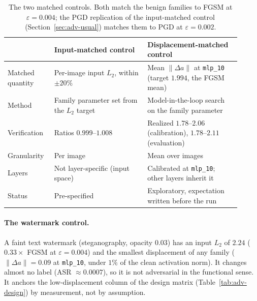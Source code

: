 \documentclass[../ppgc-tese.tex]{subfiles}
\begin{document}
\begin{table}[ht]
  \centering
  \caption{The two matched controls. Both match the benign families to FGSM at
  $\varepsilon{=}0.004$; the PGD replication of the input-matched control
  (Section~\ref{sec:adv-usual}) matches them to PGD at $\varepsilon{=}0.002$.}
  \label{tab:adv-controls}
  \small
  \begin{tabular}{@{}>{\raggedright\arraybackslash}p{0.17\linewidth}>{\raggedright\arraybackslash}p{0.37\linewidth}>{\raggedright\arraybackslash}p{0.37\linewidth}@{}}
    \toprule
     & Input-matched control & Displacement-matched control \\
    \midrule
    Matched quantity & Per-image input $L_2$, within $\pm20\%$ & Mean $\lVert\Delta a\rVert$ at \texttt{mlp\_10} (target $1.994$, the FGSM mean) \\
    Method & Family parameter set from the $L_2$ target & Model-in-the-loop search on the family parameter \\
    Verification & Ratios $0.999$--$1.008$ & Realized $1.78$--$2.06$ (calibration), $1.78$--$2.11$ (evaluation) \\
    Granularity & Per image & Mean over images \\
    Layers & Not layer-specific (input space) & Calibrated at \texttt{mlp\_10}; other layers inherit it \\
    Status & Pre-specified & Exploratory, expectation written before the run \\
    \bottomrule
  \end{tabular}
\end{table}

\paragraph*{The watermark control.}
A faint text watermark (steganography, opacity $0.03$) has an input $L_2$ of
$2.24$ ($0.33\times$ FGSM at $\varepsilon{=}0.004$) and the smallest
displacement of any family ($\lVert\Delta a\rVert=0.09$ at \texttt{mlp\_10},
under $1\%$ of the clean activation norm). It changes almost no label (ASR
$\approx0.0007$), so it is not adversarial in the functional sense.
It anchors the low-displacement
column of the design matrix (Table~\ref{tab:adv-design}) by measurement, not
by assumption.
\end{document}
